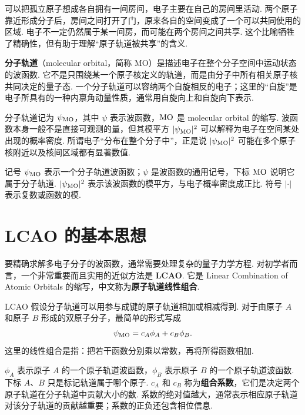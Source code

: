 \documentclass[UTF8,11pt,a4paper,openany]{ctexbook}
\newcommand{\term}[1]{\textbf{#1}}
\begin{document}
\begin{analogybox}
可以把孤立原子想成各自拥有一间房间，电子主要在自己的房间里活动. 两个原子靠近形成分子后，房间之间打开了门，原来各自的空间变成了一个可以共同使用的区域. 电子不一定仍然属于某一间房，而可能在两个房间之间共享. 这个比喻牺牲了精确性，但有助于理解“原子轨道被共享”的含义. 
\end{analogybox}

\begin{definitionbox}
\term{分子轨道}（molecular orbital，简称 MO）是描述电子在整个分子空间中运动状态的波函数. 它不是只围绕某一个原子核定义的轨道，而是由分子中所有相关原子核共同决定的量子态. 一个分子轨道可以容纳两个自旋相反的电子；这里的“自旋”是电子所具有的一种内禀角动量性质，通常用自旋向上和自旋向下表示. 
\end{definitionbox}

分子轨道记为 $\psi_{\rm MO}$，其中 $\psi$ 表示波函数，$\rm MO$ 是 molecular orbital 的缩写. 波函数本身一般不是直接可观测的量，但其模平方 $|\psi_{\rm MO}|^2$ 可以解释为电子在空间某处出现的概率密度. 所谓电子“分布在整个分子中”，正是说 $|\psi_{\rm MO}|^2$ 可能在多个原子核附近以及核间区域都有显著数值. 

\begin{notationbox}
记号 $\psi_{\rm MO}$ 表示一个分子轨道波函数；$\psi$ 是波函数的通用记号，下标 ${\rm MO}$ 说明它属于分子轨道. $|\psi_{\rm MO}|^2$ 表示该波函数的模平方，与电子概率密度成正比. 符号 $|\cdot|$ 表示复数或函数的模. 
\end{notationbox}

\section{LCAO 的基本思想}

要精确求解多电子分子的波函数，通常需要处理复杂的量子力学方程. 对初学者而言，一个非常重要而且实用的近似方法是 \term{LCAO}. 它是 Linear Combination of Atomic Orbitals 的缩写，中文称为\term{原子轨道线性组合}. 

\begin{definitionbox}
LCAO 假设分子轨道可以用参与成键的原子轨道相加或相减得到. 对于由原子 $A$ 和原子 $B$ 形成的双原子分子，最简单的形式写成
\[
\psi_{\rm MO}=c_A\phi_A+c_B\phi_B.
\]
这里的线性组合是指：把若干函数分别乘以常数，再将所得函数相加. 
\end{definitionbox}

\begin{notationbox}
$\phi_A$ 表示原子 $A$ 的一个原子轨道波函数，$\phi_B$ 表示原子 $B$ 的一个原子轨道波函数. 下标 $A$、$B$ 只是标记轨道属于哪个原子. $c_A$ 和 $c_B$ 称为\term{组合系数}，它们是决定两个原子轨道在分子轨道中贡献大小的数. 系数的绝对值越大，通常表示相应原子轨道对该分子轨道的贡献越重要；系数的正负还包含相位信息. 
\end{notationbox}
\end{document}
